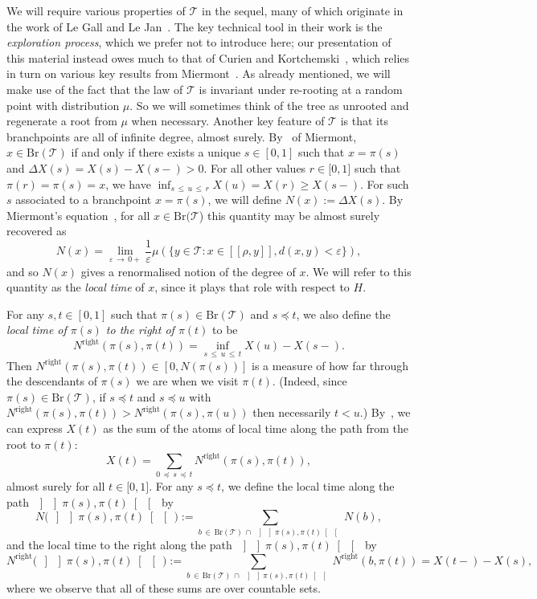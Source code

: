 \documentclass[AHL,Unicode,longabstracts,published]{cedram}
\newcommand{\intervalle}[4]{\mathopen{#1}#2
\mathclose{}\mathpunct{},#3
\mathclose{#4}}
\newcommand{\intervalleff}[2]{\intervalle{[}{#1}{#2}{]}}
\newcommand{\seg}[2]{\left[\! \left[#1, #2 \right] \! \right]}
\newcommand{\oseg}[2]{\, \left] \! \left] #1, #2 \right[\! \right[\,}
\newcommand{\Br}{\mathrm{Br}}
\newcommand{\Rightll}{\mathrm{right}}
\newcommand{\cT}{\mathcal{T}}
\begin{document}
We will require various properties of $\cT$ in the sequel, many of which originate in the work of Le Gall and Le Jan~\cite{LeGallLeJan}. The key technical tool in their work is the \emph{exploration process}, which we prefer not to introduce here; our presentation of this material instead owes much to that of Curien and Kortchemski~\cite{CRLoop13}, which relies in turn on various key results from Miermont~\cite{Mier05}. As already mentioned, we will make use of the fact that the law of $\cT$ is invariant under re-rooting at a random point with distribution $\mu$. So we will sometimes think of the tree as unrooted and regenerate a root from $\mu$ when necessary. Another key feature of $\cT$ is that its branchpoints are all of infinite degree, almost surely. By~\cite[Proposition~2]{Mier05} of Miermont, $x \in \Br(\cT)$ if and only if there exists a unique $s \in [0,1]$ such that $x = \pi(s)$ and $\Delta X(s) = X(s) - X(s-) > 0$. For all other values $r\in\intervalleff{0}{1}$ such that $\pi(r)=\pi(s)=x$, we have $\inf_{s\,\leq\,u\,\leq\,r} X(u)=X(r)\geq X(s-)$. For such $s$ associated to a branchpoint $x = \pi(s)$, we will define $N(x) := \Delta X(s)$. By Miermont's equation~\cite[Eq.~(1)]{Mier05}, for all $x \in \Br(\cT$) this quantity may be almost surely recovered as
\[
N(x) = \lim_{\varepsilon\,\to\,0+} \frac{1}{\varepsilon} \mu\left(\big\{y \in \cT:x \in \seg{\rho}{y}, d(x,y) < \varepsilon\big\}\right),
\]
and so $N(x)$ gives a renormalised notion of the degree of $x$. We will refer to this quantity as the \emph{local time} of $x$, since it plays that role with respect to $H$.

For any $s,t \in [0,1]$ such that $\pi(s) \in \Br(\cT)$ and $s \preceq t$, we also define the \emph{local time of $\pi(s)$ to the right of $\pi(t)$} to be
\[
N^{\Rightll}(\pi(s),\pi(t)) = \inf_{s\,\le\,u\,\le\,t} X(u) - X(s-).
\]
Then $N^{\Rightll}(\pi(s),\pi(t)) \in [0,N(\pi(s))]$ is a measure of how far through the descendants of $\pi(s)$ we are when we visit $\pi(t)$. (Indeed, since $\pi(s) \in \Br(\cT)$, if $s \preceq t$ and $s \preceq u$ with $N^{\Rightll}(\pi(s), \pi(t)) > N^{\Rightll}(\pi(s), \pi(u))$ then necessarily $t < u$.) By~\cite[Corollary~3.4]{CRLoop13}, we can express $X(t)$ as the sum of the atoms of local time along the path from the root to $\pi(t)$:
\begin{equation}\label{eq:local time on the right of the path from the root}
X(t)=\sum_{0\,\preceq\,s\,\preceq\,t} N^{\Rightll}(\pi(s),\pi(t)),
\end{equation}
almost surely for all $t\in\intervalleff{0}{1}$. For any $s \preceq t$, we define the local time along the path $\oseg{\pi(s)}{\pi(t)}$ by
\[
N\big(\oseg{\pi(s)}{\pi(t)}\big) := \sum_{b\,\in\, \Br(\cT)\,\cap\,\oseg{\pi(s)}{\pi(t)}} N(b),
\]
and the local time to the right along the path $\oseg{\pi(s)}{\pi(t)}$ by
\[
N^{\Rightll}\big(\oseg{\pi(s)}{\pi(t)}\big) := \sum_{b\,\in\,\Br(\cT)\,\cap\,\oseg{\pi(s)}{\pi(t)}} N^{\Rightll}(b,\pi(t)) = X(t-) - X(s),
\]
where we observe that all of these sums are over countable sets.
\end{document}
